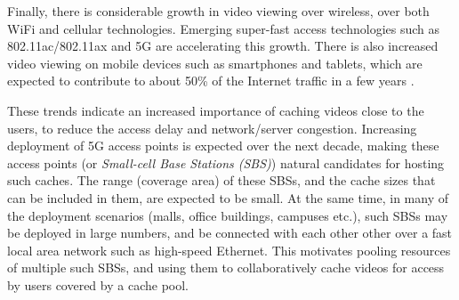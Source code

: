 \documentclass[conference]{IEEEtran}
\newcommand\JC[1]{\textcolor{red}{#1}}
\begin{document}
Finally, there is considerable growth in video viewing over wireless, over both WiFi and cellular technologies.  Emerging super-fast access technologies such as 802.11ac/802.11ax and 5G are accelerating this growth. There is also increased video viewing on mobile devices such as smartphones and tablets, which are expected to contribute to about 50\% of the Internet traffic in a few years \cite{Cisco2019}. 

These trends indicate an increased importance of caching videos close to the users, to reduce the access delay and network/server congestion. Increasing deployment of 5G access points is expected over the next decade, making these access points (or \textit{Small-cell Base Stations (SBS)}) natural candidates for hosting such caches. The range (coverage area) of these SBSs, and the cache sizes that can be included in them, are expected to be small. 
At the same time, in many of the deployment scenarios (malls, office buildings, campuses etc.), such SBSs may be deployed in large numbers, and be connected with each other other over a fast local area network such as high-speed Ethernet. This motivates pooling resources of multiple such SBSs, and using them to collaboratively cache videos for access by users covered by a cache pool.
\end{document}
